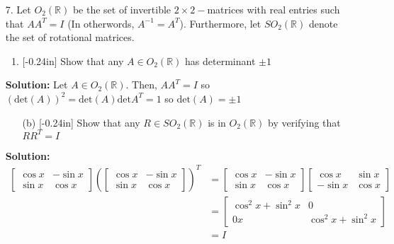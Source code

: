 \documentclass[letterpaper,12pt]{article}
\theoremstyle{definition}
\begin{document}
\begin{enumerate}
    \item[7.] Let $O_2(\mathbb{R})$ be the set of invertible $2\times2-$matrices with real entries such that $AA^T = I$ (In otherwords, $A^{-1} = A^T$). Furthermore, let $SO_2(\mathbb{R})$ denote the set of rotational matrices.
    \begin{enumerate}
        \item\reversemarginpar{}[-0.24in] Show that any $A \in O_2(\mathbb{R})$ has determinant $\pm 1$
        \end{enumerate}
        \begin{mdframed}
            \textbf{Solution:}
            Let $A \in O_2(\mathbb{R})$. Then, $AA^T = I$ so $(\mathrm{det}(A))^2 = \mathrm{det}(A)\mathrm{det}A^T = 1$ so $\mathrm{det}(A) = \pm 1$
        \end{mdframed}
        \vspace{0.5in}
        \begin{enumerate}
        \item[(b)]\reversemarginpar{}[-0.24in] Show that any $R \in SO_2(\mathbb{R})$ is in $O_2(\mathbb{R})$ by verifying that $RR^T = I$
    \end{enumerate}
     \begin{mdframed}
            \textbf{Solution:}
            \begin{align*}
                \begin{bmatrix}
                    \cos x & -\sin x \\ \sin x & \cos x
                \end{bmatrix} \left (\begin{bmatrix}
                    \cos x & -\sin x \\ \sin x & \cos x
                \end{bmatrix}\right )^T &=  \begin{bmatrix}
                    \cos x & -\sin x \\ \sin x & \cos x
                \end{bmatrix} \begin{bmatrix}
                    \cos x & \sin x \\ -\sin x & \cos x
                \end{bmatrix} \\
                &=  \begin{bmatrix}
                    \cos^2 x + \sin^2 x& 0\\ 0x& \cos^2 x + \sin^2 x 
                \end{bmatrix} \\
                &= I
            \end{align*}
        \end{mdframed}
\end{enumerate}
\end{document}
